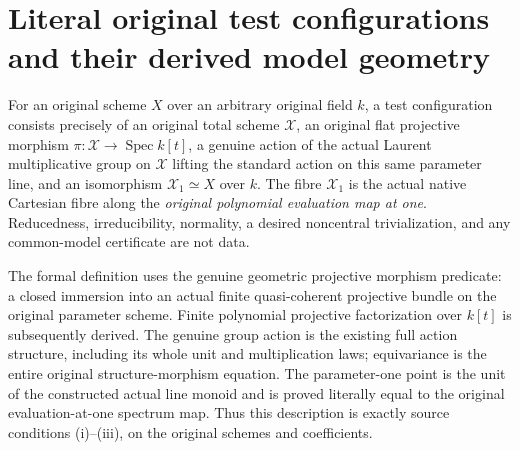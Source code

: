 \section{Literal original test configurations and their derived model geometry}
\label{sec:native-test-configuration-data}

\begin{definition}
\label{def:native-test-configuration-data}
\leanok
{}
For an original scheme $X$ over an arbitrary original field $k$,
a test configuration consists precisely of an original total
scheme $\mathcal X$, an original flat projective morphism
$\pi:\mathcal X\to\operatorname{Spec}k[t]$, a genuine action
of the actual Laurent multiplicative group on $\mathcal X$
lifting the standard action on this same parameter line,
and an isomorphism $\mathcal X_1\simeq X$ over $k$.
The fibre $\mathcal X_1$ is the actual native Cartesian fibre
along the \emph{original polynomial evaluation map at one}.
Reducedness, irreducibility, normality, a desired noncentral
trivialization, and any common-model certificate are not data.
\end{definition}

The formal definition uses the genuine geometric projective
morphism predicate: a closed immersion into an actual finite
quasi-coherent projective bundle on the original parameter
scheme. Finite polynomial projective factorization over
$k[t]$ is subsequently derived. The genuine group action is
the existing full action structure, including its whole unit
and multiplication laws; equivariance is the entire original
structure-morphism equation. The parameter-one point is the
unit of the constructed actual line monoid and is
proved literally equal to the original evaluation-at-one
spectrum map. Thus this description is exactly source
conditions (i)--(iii), on the original schemes and coefficients.

